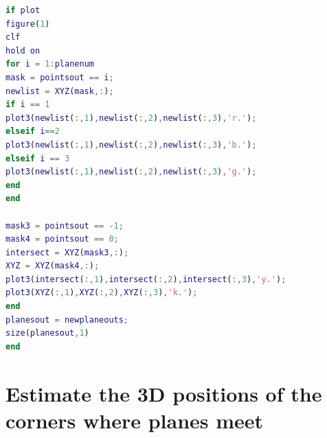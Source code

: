 \documentclass[10pt,a4paper]{article}
\begin{document}
\begin{lstlisting}[language=matlab]
%plot stuff
if plot
figure(1)
clf
hold on
for i = 1:planenum
mask = pointsout == i;
newlist = XYZ(mask,:);
if i == 1
plot3(newlist(:,1),newlist(:,2),newlist(:,3),'r.');
elseif i==2 
plot3(newlist(:,1),newlist(:,2),newlist(:,3),'b.');
elseif i == 3
plot3(newlist(:,1),newlist(:,2),newlist(:,3),'g.');
end
end

mask3 = pointsout == -1;
mask4 = pointsout == 0;
intersect = XYZ(mask3,:);
XYZ = XYZ(mask4,:);
plot3(intersect(:,1),intersect(:,2),intersect(:,3),'y.');
plot3(XYZ(:,1),XYZ(:,2),XYZ(:,3),'k.');
end
planesout = newplaneouts;
size(planesout,1)
end

\end{lstlisting}

\section{Estimate the 3D positions of the corners where planes meet}
	\label{algapp:corner} 
\end{document}
